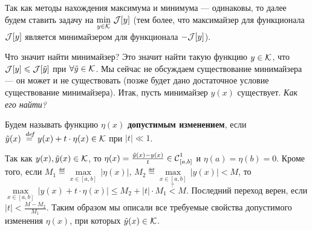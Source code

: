 Так как методы нахождения максимума и минимума --- одинаковы, то далее будем ставить задачу на $\min\limits_{y\in\mc{K}}\,\J[y]$ (тем более, что максимайзер для функционала $\J[y]$ является минимайзером для функционала $-\J[y]$). 

Что значит найти минимайзер? Это значит найти такую функцию $y\in\mc{K}$, что $\J[y]\leqslant\J[\tilde{y}]$ при $\forall\tilde{y}\in\mc{K}$. Мы сейчас не обсуждаем существование минимайзера --- он может и не существовать (позже будет дано достаточное условие существование минимайзера). Итак, пусть минимайзер $y(x)$ существует. \emph{Как его найти?}
\begin{_def}
	Будем называть функцию $\eta(x)$ \textbf{допустимым изменением}, если \\
	$\tilde{y}(x)\eqdef y(x)+t\cdot\eta(x)\in\mc{K}$ при $|t|\ll1$.
\end{_def}
Так как $y(x),\tilde{y}(x)\in\mc{K}$, то $\eta(x)=\frac{\tilde{y}(x)-y(x)}t\in\Cfn[{[a,b]}]{1}$ и $\eta(a)=\eta(b)=0$. Кроме того, если $M_1\eqdef\max\limits_{x\in{[a,b]}}\,|\eta(x)|$, $M_2\eqdef\max\limits_{x\in{[a,b]}}\,|y(x)|<M$, то 
$\max\limits_{x\in{[a,b]}}\,|y(x)+t\cdot\eta(x)|\leqslant M_2+|t|\cdot M_1\stackrel{?}{<}M$. Последний переход верен, если $|t|<\frac{M-M_2}{M_1}$. Таким образом мы описали все требуемые свойства допустимого изменения $\eta(x)$, при которых $\tilde{y}(x)\in\mc{K}$.

